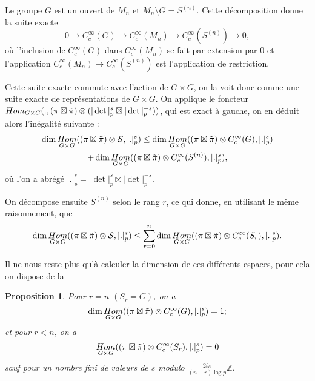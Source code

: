 \documentclass{amsart}
\newtheorem{proposition}{Proposition}
\DeclareMathOperator{\Hom}{\mathnormal{Hom}}
\begin{document}
Le groupe $G$ est un ouvert de $M_n$ et $M_n \setminus G = S^{(n)}$. Cette décomposition donne la suite exacte
\begin{equation}
0 \rightarrow C^\infty_c(G) \rightarrow C^\infty_c(M_n) \rightarrow C^\infty_c(S^{(n)}) \rightarrow 0,
\end{equation}
où l'inclusion de $C^\infty_c(G)$ dans $C^\infty_c(M_n)$ se fait par extension par $0$ et l'application $C^\infty_c(M_n) \rightarrow C^\infty_c(S^{(n)})$ est l'application de restriction.

Cette suite exacte commute avec l'action de $G \times G$, on la voit donc comme une suite exacte de représentations de $G \times G$. On applique le foncteur $\Hom_{G \times G} (., (\pi \boxtimes \tilde{\pi}) \otimes (|\det|_p^s \boxtimes |\det|_p^{-s}))$, qui est exact à gauche, on en déduit alors l'inégalité suivante :
\begin{multline}
\dim \Hom_{G \times G} ((\pi \boxtimes \tilde{\pi}) \otimes \mathcal{S}, |.|_p^s) \leq \dim \Hom_{G \times G} ((\pi \boxtimes \tilde{\pi}) \otimes C^\infty_c(G), |.|_p^s) \\
+ \dim \Hom_{G \times G} ((\pi \boxtimes \tilde{\pi}) \otimes C^\infty_c(S^{(n)}), |.|_p^s),
\end{multline}
où l'on a abrégé $|.|_p^s = |\det|_p^s \boxtimes |\det|_p^{-s}$.

On décompose ensuite $S^{(n)}$ selon le rang $r$, ce qui donne, en utilisant le même raisonnement, que
\begin{equation}
\dim \Hom_{G \times G} ((\pi \boxtimes \tilde{\pi}) \otimes \mathcal{S}, |.|_p^s) \leq \sum_{r=0}^{n} \dim \Hom_{G \times G} ((\pi \boxtimes \tilde{\pi}) \otimes C^\infty_c(S_r), |.|_p^s).
\end{equation}

Il ne nous reste plus qu'à calculer la dimension de ces différents espaces, pour cela on dispose de la
\begin{proposition}
Pour $r=n$ $(S_r = G)$, on a
\begin{equation}
\dim \Hom_{G \times G} ( (\pi \boxtimes \tilde{\pi}) \otimes C_{c}^\infty(G), |.|_p^s) = 1;
\end{equation}
et pour $r < n$, on a
\begin{equation}
\Hom_{G \times G} ( (\pi \boxtimes \tilde{\pi}) \otimes C_{c}^\infty(S_r), |.|_p^s) = 0
\end{equation}
sauf pour un nombre fini de valeurs de $s$ modulo $\frac{2i\pi}{(n-r)\log p}\mathbb{Z}$.
\end{proposition}
\end{document}
